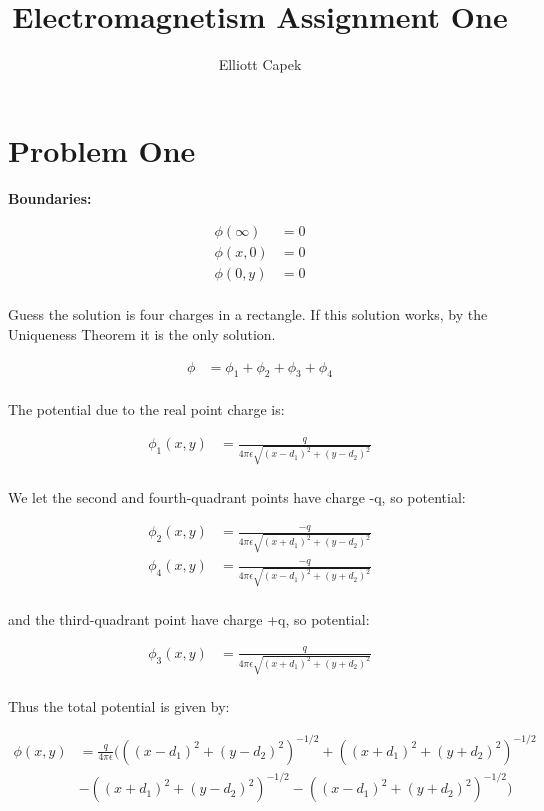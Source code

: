 \documentclass[10pt]{article} %
\title{Electromagnetism Assignment One}
\author{Elliott Capek}
\begin{document}
\maketitle{}

\section{Problem One}
\textbf{Boundaries:}

\begin{align*}
  \phi(\infty) &= 0\\
  \phi(x,0) &= 0\\
  \phi(0,y) &= 0\\
\end{align*}

Guess the solution is four charges in a rectangle. If this solution works, by the Uniqueness Theorem it is the only solution.

\begin{align*}
  \phi &= \phi_1 + \phi_2 + \phi_3 + \phi_4\\
\end{align*}

The potential due to the real point charge is:

\begin{align*}
  \phi_1(x,y) &= \frac{q}{4\pi\epsilon\sqrt{(x-d_1)^2+(y-d_2)^2}}\\
\end{align*}

We let the second and fourth-quadrant points have charge -q, so potential:

\begin{align*}
  \phi_2(x,y) &= \frac{-q}{4\pi\epsilon\sqrt{(x+d_1)^2+(y-d_2)^2}}\\
  \phi_4(x,y) &= \frac{-q}{4\pi\epsilon\sqrt{(x-d_1)^2+(y+d_2)^2}}\\
\end{align*}

and the third-quadrant point have charge +q, so potential:

\begin{align*}
  \phi_3(x,y) &= \frac{q}{4\pi\epsilon\sqrt{(x+d_1)^2+(y+d_2)^2}}\\
\end{align*}

Thus the total potential is given by:

\begin{align*}
  \phi(x,y) &= \frac{q}{4\pi\epsilon}\Big(
  \left((x-d_1)^2+(y-d_2)^2\right)^{-1/2} + \left((x+d_1)^2+(y+d_2)^2\right)^{-1/2}\\
  &-\left((x+d_1)^2+(y-d_2)^2\right)^{-1/2} - \left((x-d_1)^2+(y+d_2)^2\right)^{-1/2}\Big)
\end{align*}
\end{document}
